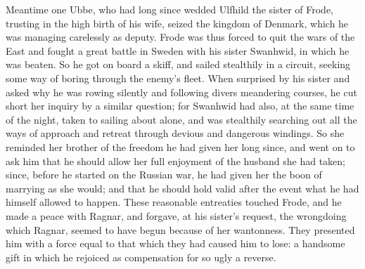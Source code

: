 \documentclass[10pt,a4paper]{report}
\begin{document}
Meantime one Ubbe, who had long since wedded Ulfhild the sister of Frode, trusting in the high birth of his wife, seized the kingdom of Denmark, which he was managing carelessly as deputy. Frode was thus forced to quit the wars of the East and fought a great battle in Sweden with his sister Swanhwid, in which he was beaten. So he got on board a skiff, and sailed stealthily in a circuit, seeking some way of boring through the enemy's fleet. When surprised by his sister and asked why he was rowing silently and following divers meandering courses, he cut short her inquiry by a similar question; for Swanhwid had also, at the same time of the night, taken to sailing about alone, and was stealthily searching out all the ways of approach and retreat through devious and dangerous windings. So she reminded her brother of the freedom he had given her long since, and went on to ask him that he should allow her full enjoyment of the husband she had taken; since, before he started on the Russian war, he had given her the boon of marrying as she would; and that he should hold valid after the event what he had himself allowed to happen. These reasonable entreaties touched Frode, and he made a peace with Ragnar, and forgave, at his sister's request, the wrongdoing which Ragnar, seemed to have begun because of her wantonness. They presented him with a force equal to that which they had caused him to lose: a handsome gift in which he rejoiced as compensation for so ugly a reverse.\\
\end{document}
